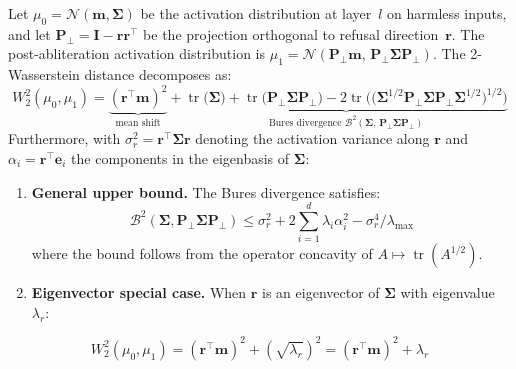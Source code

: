 \begin{theorem}
\label{thm:wasserstein}
Let $\mu_0 = \mathcal{N}(\mathbf{m}, \boldsymbol{\Sigma})$ be the activation distribution at layer~$l$ on harmless inputs, and let $\mathbf{P}_\perp = \mathbf{I} - \mathbf{r}\mathbf{r}^\top$ be the projection orthogonal to refusal direction~$\mathbf{r}$.
The post-abliteration activation distribution is $\mu_1 = \mathcal{N}(\mathbf{P}_\perp \mathbf{m}, \,\mathbf{P}_\perp \boldsymbol{\Sigma} \mathbf{P}_\perp)$.
The 2-Wasserstein distance decomposes as:
\begin{equation}
    W_2^2(\mu_0, \mu_1) = \underbrace{(\mathbf{r}^\top \mathbf{m})^2}_{\text{mean shift}} + \underbrace{\operatorname{tr}\!\big(\boldsymbol{\Sigma}\big) + \operatorname{tr}\!\big(\mathbf{P}_\perp \boldsymbol{\Sigma} \mathbf{P}_\perp\big) - 2\operatorname{tr}\!\Big(\big(\boldsymbol{\Sigma}^{1/2}\mathbf{P}_\perp\boldsymbol{\Sigma}\mathbf{P}_\perp\boldsymbol{\Sigma}^{1/2}\big)^{1/2}\Big)}_{\text{Bures divergence } \mathcal{B}^2(\boldsymbol{\Sigma},\, \mathbf{P}_\perp\boldsymbol{\Sigma}\mathbf{P}_\perp)}
\end{equation}
Furthermore, with $\sigma_r^2 = \mathbf{r}^\top\boldsymbol{\Sigma}\mathbf{r}$ denoting the activation variance along $\mathbf{r}$ and $\alpha_i = \mathbf{r}^\top\mathbf{e}_i$ the components in the eigenbasis of $\boldsymbol{\Sigma}$:
\begin{enumerate}[label=(\roman*)]
    \item \textbf{General upper bound.} The Bures divergence satisfies:
    \begin{equation}
        \mathcal{B}^2(\boldsymbol{\Sigma}, \mathbf{P}_\perp\boldsymbol{\Sigma}\mathbf{P}_\perp) \leq \sigma_r^2 + 2\sum_{i=1}^d \lambda_i \alpha_i^2 - \sigma_r^4/\lambda_{\max}
    \end{equation}
    where the bound follows from the operator concavity of $A \mapsto \operatorname{tr}(A^{1/2})$.
    \item \textbf{Eigenvector special case.} When $\mathbf{r}$ is an eigenvector of $\boldsymbol{\Sigma}$ with eigenvalue $\lambda_r$:
\end{enumerate}
\begin{equation}
    W_2^2(\mu_0, \mu_1) = (\mathbf{r}^\top\mathbf{m})^2 + ({\sqrt{\lambda_r}})^2 = (\mathbf{r}^\top\mathbf{m})^2 + \lambda_r
\end{equation}
\end{theorem}

